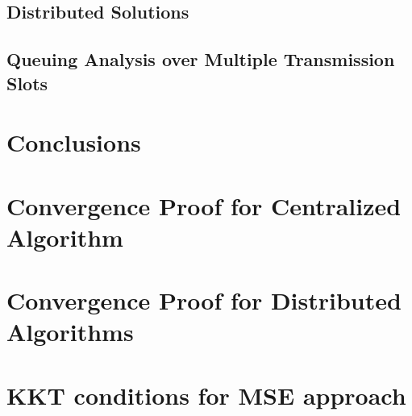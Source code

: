 \documentclass[10pt,journal,twocolumn,letterpaper]{./../Styles/IEEEtran}
\begin{document}
\subsection{Distributed Solutions} \label{sec-5.2}


\subsection{Queuing Analysis over Multiple Transmission Slots} \label{time-correlated}
\review{}

\section{Conclusions} \label{sec-6}





\clearpage

\appendices

%


\section{Convergence Proof for Centralized Algorithm} \label{sec-3.5}


\section{Convergence Proof for Distributed Algorithms} \label{sec-dist-conv}


\section{\ac{KKT} conditions for \ac{MSE} approach} \label{a-1}

\end{document}

